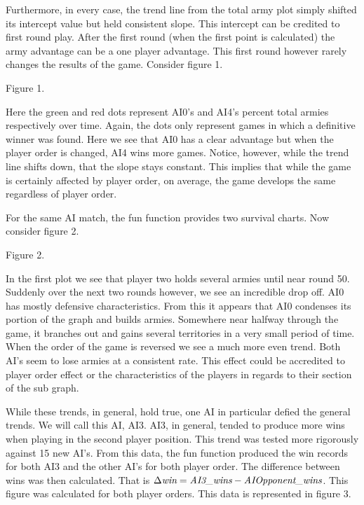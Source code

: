 \documentclass[12pt]{article}  %
\begin{document}
Furthermore, in every case, the trend line from the total army plot simply shifted its intercept value but held consistent slope. This intercept can be credited to first round play. After the first round (when the first point is calculated) the army advantage can be a one player advantage. This first round however rarely changes the results of the game. Consider figure 1. 

\begin{center}
{\footnotesize Figure 1.}
\end{center}

Here the green and red dots represent AI0’s and AI4’s percent total armies respectively over time. Again, the dots only represent games in which a definitive winner was found. Here we see that AI0 has a clear advantage but when the player order is changed, AI4 wins more games. Notice, however, while the trend line shifts down, that the slope stays constant. This implies that while the game is certainly affected by player order, on average, the game develops the same regardless of player order. 

For the same AI match, the fun function provides two survival charts. Now consider figure 2. 


\begin{center}
{\footnotesize Figure 2.}
\end{center}

In the first plot we see that player two holds several armies until near round 50. Suddenly over the next two rounds however, we see an incredible drop off. AI0 has mostly defensive characteristics. From this it appears that AI0 condenses its portion of the graph and builds armies. Somewhere near halfway through the game, it branches out and gains several territories in a very small period of time. When the order of the game is reversed we see a much more even trend. Both AI’s seem to lose armies at a consistent rate. This effect could be accredited to player order effect or the characteristics of the players in regards to their section of the sub graph. 


While these trends, in general, hold true, one AI in particular defied the general trends. We will call this AI, AI3. AI3, in general, tended to produce more wins when playing in the second player position. This trend was tested more rigorously against 15 new AI’s. From this data, the fun function produced the win records for both AI3 and the other AI’s for both player order. The difference between wins was then calculated. That is $\Delta \emph{win} = \emph{AI3\_wins} - \emph{AIOpponent\_wins}$. This figure was calculated for both player orders. This data is represented in figure 3.
\end{document}
